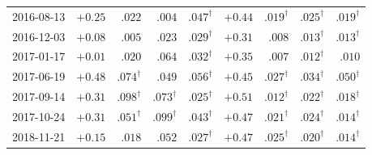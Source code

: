 \begin{tabular}{l r rrr r rrr}
2016-08-13 & $+0.25$ & $.022$ & $.004$ & $.047^\dagger$ & $+0.44$ & $.019^\dagger$ & $.025^\dagger$ & $.019^\dagger$ \\
2016-12-03 & $+0.08$ & $.005$ & $.023$ & $.029^\dagger$ & $+0.31$ & $.008$ & $.013^\dagger$ & $.013^\dagger$ \\
2017-01-17 & $+0.01$ & $.020$ & $.064$ & $.032^\dagger$ & $+0.35$ & $.007$ & $.012^\dagger$ & $.010$ \\
2017-06-19 & $+0.48$ & $.074^\dagger$ & $.049$ & $.056^\dagger$ & $+0.45$ & $.027^\dagger$ & $.034^\dagger$ & $.050^\dagger$ \\
2017-09-14 & $+0.31$ & $.098^\dagger$ & $.073^\dagger$ & $.025^\dagger$ & $+0.51$ & $.012^\dagger$ & $.022^\dagger$ & $.018^\dagger$ \\
2017-10-24 & $+0.31$ & $.051^\dagger$ & $.099^\dagger$ & $.043^\dagger$ & $+0.47$ & $.021^\dagger$ & $.024^\dagger$ & $.014^\dagger$ \\
2018-11-21 & $+0.15$ & $.018$ & $.052$ & $.027^\dagger$ & $+0.47$ & $.025^\dagger$ & $.020^\dagger$ & $.014^\dagger$ \\
\bottomrule
\end{tabular}
